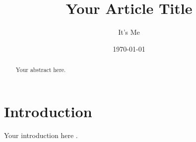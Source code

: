 \documentclass{article}
\title{Your Article Title}
\author{It's Me}
\date{\today}
\begin{document}
\maketitle

\begin{abstract}
Your abstract here.
\end{abstract}

\section{Introduction}
Your introduction here \cite{example}.



\end{document}
